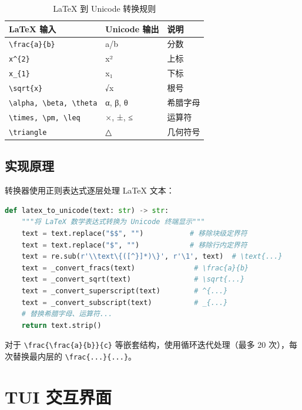 \documentclass[11pt,a4paper]{article}
\begin{document}
\begin{table}[h]
\centering
\begin{tabular}{lll}
\toprule
LaTeX 输入 & Unicode 输出 & 说明 \\
\midrule
\texttt{\textbackslash frac\{a\}\{b\}} & a/b & 分数 \\
\texttt{x\^{}\{2\}} & x² & 上标 \\
\texttt{x\_\{1\}} & x₁ & 下标 \\
\texttt{\textbackslash sqrt\{x\}} & √x & 根号 \\
\texttt{\textbackslash alpha, \textbackslash beta, \textbackslash theta} & α, β, θ & 希腊字母 \\
\texttt{\textbackslash times, \textbackslash pm, \textbackslash leq} & ×, ±, ≤ & 运算符 \\
\texttt{\textbackslash triangle} & △ & 几何符号 \\
\bottomrule
\end{tabular}
\caption{LaTeX 到 Unicode 转换规则}
\end{table}

\subsection{实现原理}

转换器使用正则表达式逐层处理 LaTeX 文本：

\begin{lstlisting}[language=Python]
def latex_to_unicode(text: str) -> str:
    """将 LaTeX 数学表达式转换为 Unicode 终端显示"""
    text = text.replace("$$", "")           # 移除块级定界符
    text = text.replace("$", "")            # 移除行内定界符
    text = re.sub(r'\\text\{([^}]*)\}', r'\1', text)  # \text{...}
    text = _convert_fracs(text)              # \frac{a}{b}
    text = _convert_sqrt(text)               # \sqrt{...}
    text = _convert_superscript(text)        # ^{...}
    text = _convert_subscript(text)          # _{...}
    # 替换希腊字母、运算符...
    return text.strip()
\end{lstlisting}

\begin{tipbox}
对于 \texttt{\textbackslash frac\{\textbackslash frac\{a\}\{b\}\}\{c\}} 等嵌套结构，使用循环迭代处理（最多 20 次），每次替换最内层的 \texttt{\textbackslash frac\{...\}\{...\}}。
\end{tipbox}

\section{TUI 交互界面}
\end{document}
